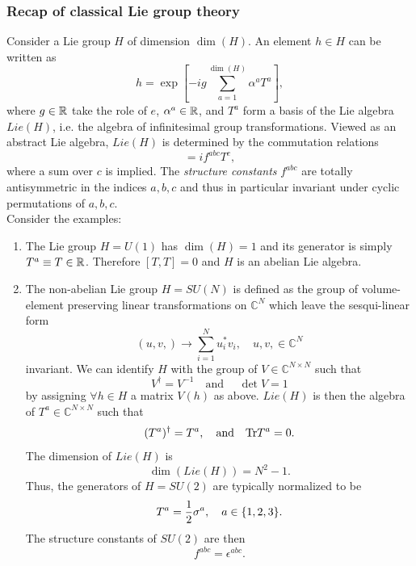 \subsubsection{Recap of classical Lie group theory}
Consider a Lie group $H$ of dimension $\dim(H)$. An element $h\in H$ can be written as
\begin{equation}
	h= \exp\left[ - i g \sum_{a=1}^{\dim(H)} \alpha^a T^a\right],
\end{equation}
where $g\in\mathbb{R}$ take the role of $e$, $\alpha^a \in \mathbb{R}$, and $T^a$ form a basis of the Lie algebra $Lie(H)$, i.e. the algebra of infinitesimal group transformations. Viewed as an abstract Lie algebra, $Lie(H)$ is determined by the commutation relations
\begin{equation}
	[T^a,T^b] = i f^{abc} T^c,
\end{equation}
where a sum over $c$ is implied. The \emph{structure constants} $f^{abc}$ are totally antisymmetric in the indices $a,b,c$ and thus in particular invariant under cyclic permutations of $a,b,c$.\\
Consider the examples:
\begin{enumerate}
	\item 
	The Lie group $H=U(1)$ has $\dim(H)=1$ and its generator is simply $T^a \equiv T\in \mathbb{R}$. Therefore $[T,T]=0$ and $H$ is an abelian Lie algebra.
	\item The non-abelian Lie group $H=SU(N)$ is defined as the group of volume-element preserving linear transformations on $\mathbb{C}^N$ which leave the sesqui-linear form
	\begin{equation}
	(u,v,) \rightarrow \sum_{i=1}^{N} u^*_i v_i, \quad u,v,\in \mathbb{C}^N
	\end{equation}
	invariant. We can identify $H$ with the group of $V\in \mathbb{C}^{N\times N}$ such that
	\begin{equation}
		V^\dagger = V^{-1} \quad \text{and } \quad \det V =1
	\end{equation}
	by assigning $\forall h \in H$ a matrix $V(h)$ as above. $Lie(H)$ is then the algebra of $T^a \in \mathbb{C}^{N\times N}$ such that
	\begin{equation}
		(T^a)^\dagger = T^a,\quad \text{and} \quad \mathrm{Tr} T^a =0.
	\end{equation}
	The dimension of $Lie(H)$ is 
	\begin{equation}
		\dim(Lie(H)) = N^2-1.
	\end{equation}
	Thus, the generators of $H=SU(2)$ are typically normalized to be
	\begin{equation}
	T^a = \frac{1}{2} \sigma^a, \quad a \in \{1,2,3\}.
	\end{equation}
	The structure constants of $SU(2)$ are then
	\begin{equation}
		f^{abc} = \epsilon^{abc}.
	\end{equation}
\end{enumerate}
